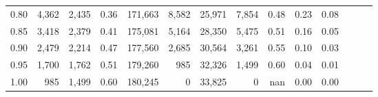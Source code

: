 \begin{tabular}{rrrrrrrrrrrrrr}
0.80 &   4,362 &  2,435 &  0.36 &  171,663 &    8,582 &  25,971 &   7,854 &  0.48 &  0.23 &      0.08 \\
0.85 &   3,418 &  2,379 &  0.41 &  175,081 &    5,164 &  28,350 &   5,475 &  0.51 &  0.16 &      0.05 \\
0.90 &   2,479 &  2,214 &  0.47 &  177,560 &    2,685 &  30,564 &   3,261 &  0.55 &  0.10 &      0.03 \\
0.95 &   1,700 &  1,762 &  0.51 &  179,260 &      985 &  32,326 &   1,499 &  0.60 &  0.04 &      0.01 \\
1.00 &     985 &  1,499 &  0.60 &  180,245 &        0 &  33,825 &       0 &   nan &  0.00 &      0.00 \\
\bottomrule
\end{tabular}
